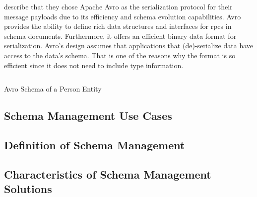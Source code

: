 \citeauthor{kreps_kafka_2011} describe that they chose Apache Avro as the serialization protocol for their message payloads due to its efficiency and schema evolution capabilities. 
Avro provides the ability to define rich data structures and interfaces for \glspl{rpc} in schema documents.
Furthermore, it offers an efficient binary data format for serialization.
Avro's design assumes that applications that (de)-serialize data have access to the data's schema.
That is one of the reasons why the format is so efficient since it does not need to include type information.
\parencite{apache_software_foundation_apache_2021}

\begin{listing}[H]
  \inputminted{json}{assets/src/Person.avsc}
  \label{lst:avro-schema-person}
  \caption{Avro Schema of a Person Entity}
\end{listing}


\subsection{Schema Management Use Cases}

\subsection{Definition of Schema Management}

\subsection{Characteristics of Schema Management Solutions}
